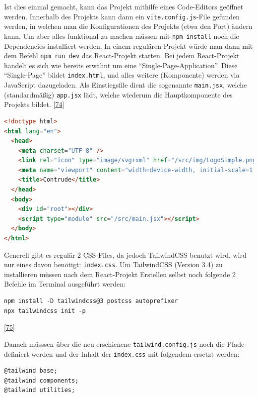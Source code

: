 \documentclass[
    headings=optiontotocandhead,%
    twoside,
    numbers=noenddot,%
    12pt, %
    titlepage, %
    parskip=full, %
    listof=leveldown, 
    numbers=noenddot, %
    a4paper,DIV=14,
    BCOR=15mm,
]{scrbook}
\newcommand{\passthrough}[1]{#1}
\begin{document}
Ist dies einmal gemacht, kann das Projekt mithilfe eines Code-Editors
geöffnet werden. Innerhalb des Projekts kann dann ein
\passthrough{\lstinline!vite.config.js!}-File gefunden werden, in
welchen man die Konfigurationen des Projekts (etwa den Port) ändern
kann. Um aber alles funktional zu machen müssen mit
\passthrough{\lstinline!npm install!} noch die Dependencies installiert
werden. In einem regulären Projekt würde man dann mit dem Befehl
\passthrough{\lstinline!npm run dev!} das React-Projekt starten. Bei
jedem React-Projekt handelt es sich wie bereits erwähnt um eine
``Single-Page-Application''. Diese ``Single-Page'' bildet
\passthrough{\lstinline!index.html!}, und alles weitere (Komponente)
werden via JavaScript dazugeladen. Als Einstiegsfile dient die
sogenannte \passthrough{\lstinline!main.jsx!}, welche (standardmäßig)
\passthrough{\lstinline!app.jsx!} lädt, welche wiederum die
Hauptkomponente des Projekts bildet.
{[}\protect\hyperlink{ref-React-CrashCourse}{74}{]}

\begin{lstlisting}[language=HTML, caption={index.html File}]
<!doctype html>
<html lang="en">
  <head>
    <meta charset="UTF-8" />
    <link rel="icon" type="image/svg+xml" href="/src/img/LogoSimple.png" />
    <meta name="viewport" content="width=device-width, initial-scale=1.0" />
    <title>Contrude</title>
  </head>
  <body>
    <div id="root"></div>
    <script type="module" src="/src/main.jsx"></script>
  </body>
</html>
\end{lstlisting}

Generell gibt es regulär 2 CSS-Files, da jedoch TailwindCSS benutzt
wird, wird nur eines davon benötigt:
\passthrough{\lstinline!index.css!}. Um TailwindCSS (Version 3.4) zu
installieren müssen nach dem React-Projekt Erstellen selbst noch
folgende 2 Befehle im Terminal ausgeführt werden:

\begin{lstlisting}[caption={TailwindCSS Installieren Befehle}]
npm install -D tailwindcss@3 postcss autoprefixer
npx tailwindcss init -p
\end{lstlisting}

{[}\protect\hyperlink{ref-TailwindCSS-Docs-ViteSetup}{75}{]}

Danach müsssen über die neu erschienene
\passthrough{\lstinline!tailwind.config.js!} noch die Pfade definiert
werden und der Inhalt der \passthrough{\lstinline!index.css!} mit
folgendem ersetzt werden:

\begin{lstlisting}[caption={Updaten der index.css für TailwindCSS}]
@tailwind base;
@tailwind components;
@tailwind utilities;
\end{lstlisting}
\end{document}
